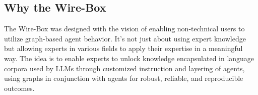 \documentclass[11pt, a4paper]{article}
\begin{document}


    \begin{gitbox}
        \section*{Why the Wire-Box}
        The Wire-Box was designed with the vision of enabling non-technical users to utilize graph-based agent behavior. It's not just about using expert knowledge but allowing experts in various fields to apply their expertise in a meaningful way. The idea is to enable experts to unlock knowledge encapsulated in language corpora used by LLMs through customized instruction and layering of agents, using graphs in conjunction with agents for robust, reliable, and reproducible outcomes.
    \end{gitbox}
\end{document}
